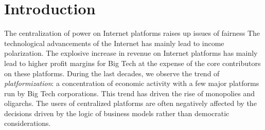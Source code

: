 \chapter{Introduction}
\label{introduction}
The centralization of power on Internet platforms raises up issues of fairness %
The technological advancements of the Internet has mainly lead to income polarization. The explosive increase in revenue on Internet platforms has mainly lead to higher profit margins for Big Tech %
at the expense of the core contributors on these platforms. During the last decades, we observe the trend of \textit{platformization}: a concentration of economic activity %
with a few major platforms run by Big Tech corporations. 
This trend has driven %
the rise of monopolies and oligarchs.  %
The users of centralized platforms are often negatively affected by the decisions driven by the logic of business models rather than democratic considerations. 

